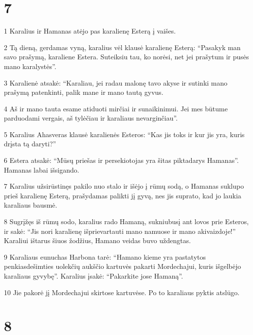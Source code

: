 \chapter{7}


\par 1 Karalius ir Hamanas atėjo pas karalienę Esterą į vaišes. 
\par 2 Tą dieną, gerdamas vyną, karalius vėl klausė karalienę Esterą: “Pasakyk man savo prašymą, karaliene Estera. Suteiksiu tau, ko norėsi, net jei prašytum ir pusės mano karalystės”. 
\par 3 Karalienė atsakė: “Karaliau, jei radau malonę tavo akyse ir sutinki mano prašymą patenkinti, palik mane ir mano tautą gyvus. 
\par 4 Aš ir mano tauta esame atiduoti mirčiai ir sunaikinimui. Jei mes būtume parduodami vergais, aš tylėčiau ir karaliaus nevarginčiau”. 
\par 5 Karalius Ahasveras klausė karalienės Esteros: “Kas jis toks ir kur jis yra, kuris drįsta tą daryti?” 
\par 6 Estera atsakė: “Mūsų priešas ir persekiotojas yra šitas piktadarys Hamanas”. Hamanas labai išsigando. 
\par 7 Karalius užsirūstinęs pakilo nuo stalo ir išėjo į rūmų sodą, o Hamanas suklupo prieš karalienę Esterą, prašydamas palikti jį gyvą, nes jis suprato, kad jo laukia karaliaus bausmė. 
\par 8 Sugrįžęs iš rūmų sodo, karalius rado Hamaną, sukniubusį ant lovos prie Esteros, ir sakė: “Jis nori karalienę išprievartauti mano namuose ir mano akivaizdoje!” Karaliui ištarus šiuos žodžius, Hamano veidas buvo uždengtas. 
\par 9 Karaliaus eunuchas Harbona tarė: “Hamano kieme yra pastatytos penkiasdešimties uolekčių aukščio kartuvės pakarti Mordechajui, kuris išgelbėjo karaliaus gyvybę”. Karalius įsakė: “Pakarkite jose Hamaną”. 
\par 10 Jie pakorė jį Mordechajui skirtose kartuvėse. Po to karaliaus pyktis atslūgo.



\chapter{8}


